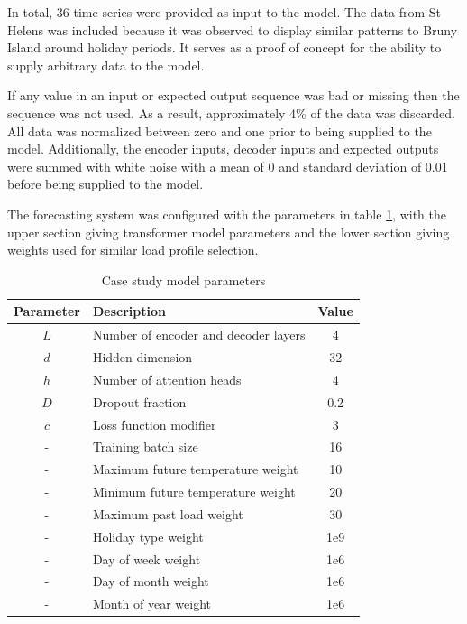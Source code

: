 \documentclass[conference]{IEEEtran}
\begin{document}
In total, 36 time series were provided as input to the model.
The data from St Helens was included because it was observed to display similar patterns to Bruny Island around holiday periods. It serves as a proof of concept for the ability to supply arbitrary data to the model.

If any value in an input or expected output sequence was bad or missing then the sequence was not used.
As a result, approximately 4\% of the data was discarded.
All data was normalized between zero and one prior to being supplied to the model.
Additionally, the encoder inputs, decoder inputs and expected outputs were summed with white noise with a mean of 0 and standard deviation of 0.01 before being supplied to the model.

The forecasting system was configured with the parameters in table \ref{table:parameters}, with the upper section giving transformer model parameters and the lower section giving weights used for similar load profile selection.

\begin{table}[htbp]
	\caption{Case study model parameters}
	\begin{center}
		\begin{tabular}{clc}
			\textbf{Parameter}&\textbf{Description}&\textbf{Value} \\
			\hline
			$L$ & Number of encoder and decoder layers & 4 \\
			$d$ & Hidden dimension & 32 \\
			$h$ & Number of attention heads & 4 \\
			$D$ & Dropout fraction & 0.2 \\
			$c$ & Loss function modifier & 3 \\
			-   & Training batch size & 16 \\
			\hline
			-   & Maximum future temperature weight & 10 \\
			-   & Minimum future temperature weight & 20 \\
			-   & Maximum past load weight & 30 \\
			-   & Holiday type weight & 1e9 \\
			-   & Day of week weight & 1e6 \\
			-   & Day of month weight & 1e6 \\
			-   & Month of year weight & 1e6 \\
			
		\end{tabular}
		\label{table:parameters}
	\end{center}
\end{table}
\end{document}
